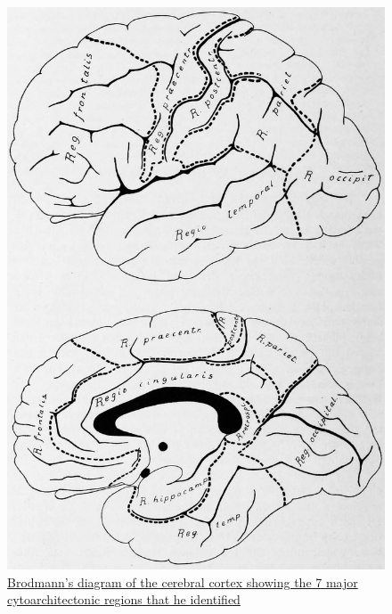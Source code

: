 \begin{figure}

{\centering \includegraphics[width=0.7\linewidth]{./figures/cns/Brodmann_hauptregionen} 

}

\caption{\href{https://wellcomelibrary.org/item/b28062449}{Brodmann's diagram of the cerebral cortex showing the 7 major cytoarchitectonic regions that he identified}}\label{fig:brodmannregions}
\end{figure}



